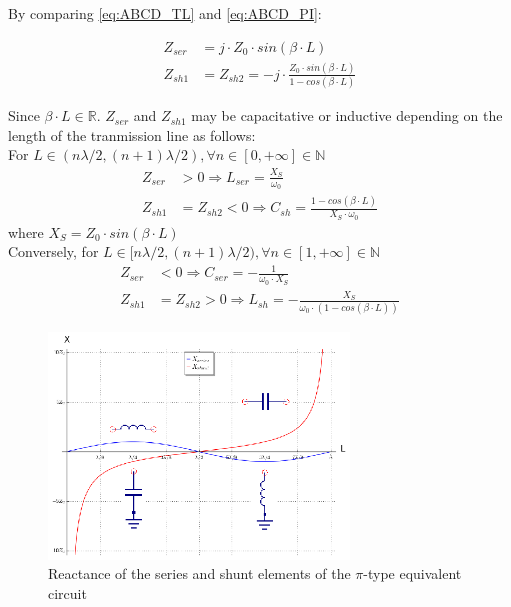 \noindent By comparing \ref{eq:ABCD_TL} and \ref{eq:ABCD_PI}:

\begin{align}
     Z_{ser} &= j \cdot Z_0 \cdot sin(\beta \cdot L) \\
     Z_{sh1} &= Z_{sh2} = -j \cdot \frac{Z_0 \cdot sin(\beta \cdot L)}{1 - cos(\beta \cdot L)}
\end{align}

\noindent Since $\beta \cdot L \in \mathbb{R}$. $Z_{ser}$ and $Z_{sh1}$ may be capacitative or inductive depending on the length of the tranmission line as follows:\\

\noindent For $L \in (n\lambda/2, (n+1) \lambda/2), \forall n  \in [0, +\infty] \in \mathbb{N}$
\begin{align}
     Z_{ser} &> 0 \Longrightarrow L_{ser} = \frac{X_S}{\omega_0} \\
     Z_{sh1} &= Z_{sh2}  < 0 \Longrightarrow C_{sh} = \frac{1 - cos(\beta \cdot L)}{X_S\cdot \omega_0}
\end{align}
\noindent where $X_S = Z_0 \cdot sin(\beta \cdot L)$\\

\noindent Conversely, for $L \in [n\lambda/2, (n+1) \lambda/2), \forall n  \in [1, +\infty] \in \mathbb{N}$
\begin{align}
     Z_{ser} &< 0 \Longrightarrow C_{ser} = -\frac{1}{\omega_0 \cdot X_S} \\
     Z_{sh1} &= Z_{sh2} > 0  \Longrightarrow L_{sh} = -\frac{X_S}{\omega_0 \cdot (1 - cos(\beta \cdot L))}
\end{align}

\begin{figure}[H]
\centering
\includegraphics[width=80mm]{./images/Synthesis/Impedance_Matching/pi-to-tee-equivalent-implementation}
\caption{Reactance of the series and shunt elements of the $\pi$-type equivalent circuit}
\label{fig:Transmission-Line-Circuit-Equivalent-Values}
\end{figure}

